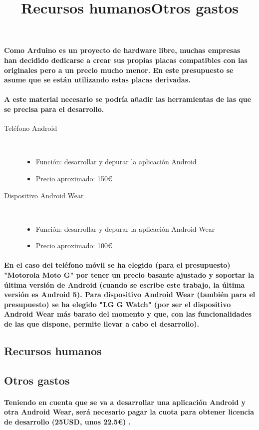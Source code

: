 \paragraph{
Como Arduino es un proyecto de hardware libre, muchas empresas han decidido
dedicarse a crear sus propias placas compatibles con las originales pero a un
precio mucho menor. En este presupuesto se asume que se están utilizando estas
placas derivadas.
}

\paragraph{
A este material necesario se podría añadir las herramientas de las que se precisa
para el desarrollo.
}
\begin{description}
  \item [Teléfono Android]\hfill \\
    \begin{itemize}
      \item {Función: desarrollar y depurar la aplicación Android}
      \item {Precio aproximado: 150\euro}
    \end{itemize}
  \item [Dispositivo Android Wear]\hfill \\
    \begin{itemize}
      \item {Función: desarrollar y depurar la aplicación Android Wear}
      \item {Precio aproximado: 100\euro}
    \end{itemize}
\end{description}

\paragraph{En el caso del teléfono móvil se ha elegido (para el presupuesto) "Motorola Moto G" por tener
un precio basante ajustado y soportar la última versión de Android (cuando se escribe este
trabajo, la última versión es Android 5). Para dispositivo Android Wear (también para el presupuesto)
se ha elegido "LG G Watch" (por ser el dispositivo Android Wear más barato del momento
y que, con las funcionalidades de las que dispone, permite llevar a cabo el desarrollo).}

\subsection{Recursos humanos}
\title{Recursos humanos}


\subsection{Otros gastos}
\title{Otros gastos}
\paragraph{
Teniendo en cuenta que se va a desarrollar una aplicación Android y otra Android Wear,
será necesario pagar la cuota para obtener licencia de desarrollo (25USD, unos 22.5\euro) \cite{desarrollaAndroid}.
}
